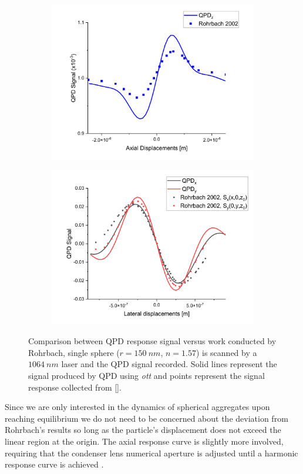 \documentclass[a4paper,oneside,11pt]{book}
\begin{document}
\begin{figure}[h]
	\label{fig:Rohrbach}
	\begin{subfigure}{0.475 \linewidth}
		\subcaption{}
		\includegraphics[width=\linewidth]{figs/QPD_axial_tests.png}
	\end{subfigure}
	\begin{subfigure}{0.475 \linewidth}
		\subcaption{}
		\includegraphics[width=\linewidth]{figs/QPD_lat_tests.png}
	\end{subfigure}
	\caption{Comparison between QPD response signal versus work conducted by Rohrbach, single sphere ($r = 150\ nm$, $n=1.57$) is scanned by a $1064\ nm$ laser and the QPD signal recorded. Solid lines represent the signal produced by QPD using \textit{ott} and points represent the signal response collected from [].}
\end{figure}
Since we are only interested in the dynamics of spherical aggregates upon reaching equilibrium we do not need to be concerned about the deviation from Rohrbach's results so long as the particle's displacement does not exceed the linear region at the origin. The axial response curve is slightly more involved, requiring that the condenser lens numerical aperture is adjusted until a harmonic response curve is achieved \cite{Friedrich2012}. 
\end{document}
